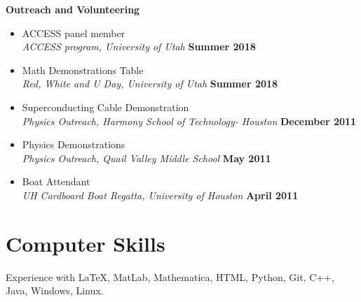 \documentclass[margin,line]{res}
\begin{document}
\begin{resume}
{\bf Outreach and Volunteering}
\begin{itemize}
    \item[ ] ACCESS panel member 
    \\ {\it ACCESS program, University of Utah} \hfill {\bf Summer 2018}
    \item[ ] Math Demonstrations Table
    \\ {\it Red, White and U Day, University of Utah} \hfill {\bf Summer 2018}
    \item[ ] Superconducting Cable Demonstration
    \\ {\it Physics Outreach, Harmony School of Technology- Houston} \hfill {\bf December 2011}
    \item[ ] Physics Demonstrations
    \\ {\it Physics Outreach, Quail Valley Middle School} \hfill {\bf May 2011}
    \item[ ] Boat Attendant
    \\ {\it UH Cardboard Boat Regatta, University of Houston} \hfill {\bf April 2011}
\end{itemize}



\section{\sc Computer Skills} 
Experience with \LaTeX, MatLab, Mathematica, HTML, Python, Git, C++, Java, Windows, Linux.


\end{resume}
\end{document}
